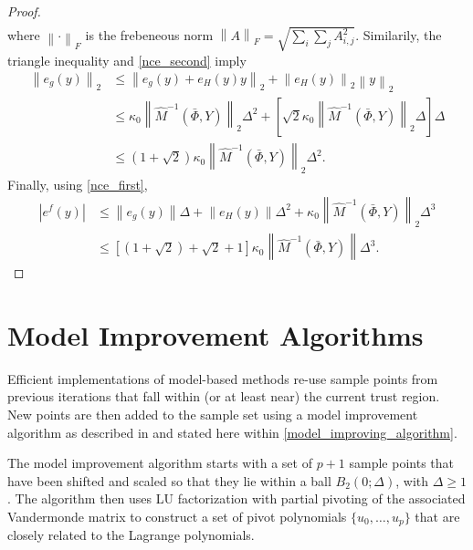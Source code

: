 \begin{proof}
\begin{align*}
\end{align*}
where $\left\|\cdot\right\|_F$ is the frebeneous norm $\left\|A\right\|_F = \sqrt{\sum_i\sum_jA_{i, j}^2}$.
Similarily, the triangle inequality and \cref{nce_second} imply
\begin{align*}
\left\|e_g\left(y\right)\right\|_2 &\le \left\|e_g(y) + e_H(y) y \right\|_2 + \left\|e_H\left(y\right)\right\|_2\left\| y\right\|_2 \\
&\le \kappa_0 \left\|\hat M^{-1}(\bar \Phi, Y) \right\|_2 \Delta^2
+ \left[\sqrt{2}\kappa_0 \left\|\hat M^{-1}(\bar \Phi, Y) \right\|_2 \Delta\right]
\Delta \\
&\le\left(1 + \sqrt 2\right)\kappa_0\left\|\hat M^{-1}(\bar \Phi, Y) \right\|_2 \Delta^2.
\end{align*}
Finally, using \cref{nce_first},
\begin{align*}
\left|e^f\left(y\right)\right| &\le \left\|e_g(y)\right\| \Delta + \left\|e_H(y)\right\|\Delta^2
+ \kappa_0 \left\|\hat M^{-1}(\bar \Phi, Y) \right\|_2 \Delta^3 \\
&\le\left[\left(1 + \sqrt 2\right) + \sqrt{2} + 1\right]\kappa_0 \left\|\hat M^{-1}(\bar \Phi, Y) \right\|\Delta^3.
\end{align*}
\end{proof}

\section{Model Improvement Algorithms}

\label{model_improvement_algorithms}
Efficient implementations of model-based methods re-use sample points from previous iterations that fall within (or at least near) the current trust region.
New points are then added to the sample set using a model improvement algorithm as described in 
\cite{introduction_book} and stated here within \cref{model_improving_algorithm}.

The model improvement algorithm starts with a set of $p+1$ sample points that have been shifted and scaled so that they lie within a ball $B_2(0;\Delta)$, with $\Delta \ge 1$.   
The algorithm then uses LU factorization with partial pivoting of the 
associated Vandermonde matrix to construct a set of pivot polynomials $\{u_0, \ldots, u_p\}$ that are closely related to the Lagrange polynomials. 


